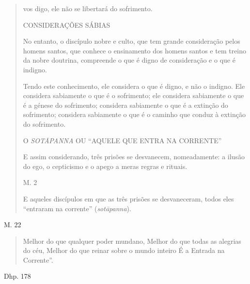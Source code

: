 \begin{quote}
vos digo, ele não se libertará do sofrimento.

CONSIDERAÇÕES SÁBIAS

No entanto, o discípulo nobre e culto, que tem grande consideração pelos homens santos, que conhece o ensinamento dos homens santos e tem treino da nobre doutrina, compreende o que é digno de consideração e o que é indigno.

Tendo este conhecimento, ele considera o que é digno, e não o indigno. Ele considera sabiamente o que é o sofrimento; ele considera sabiamente o que é a génese do sofrimento; considera sabiamente o que é a extinção do sofrimento; considera sabiamente o que é o caminho que conduz à extinção do sofrimento.

O \emph{SOTĀPANNA} OU ``AQUELE QUE ENTRA NA CORRENTE''

E assim considerando, três prisões se desvanecem, nomeadamente: a ilusão do ego, o cepticismo e o apego a meras regras e rituais.

M. 2

E aqueles discípulos em que as três prisões se desvaneceram, todos eles ``entraram na corrente'' (\emph{sotāpanna}).
\end{quote}

M. 22

\begin{quote}
Melhor do que qualquer poder mundano, Melhor do que todas as alegrias do céu, Melhor do que reinar sobre o mundo inteiro É a Entrada na Corrente''.
\end{quote}

Dhp. 178

